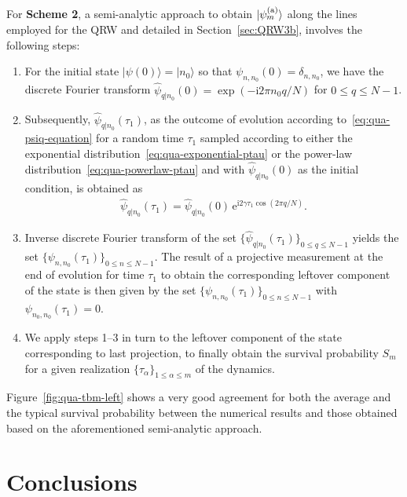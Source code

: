 \documentclass[12pt]{iopart}
\def\ra{\rangle}
\def\ket#1{\mathinner{|{#1}\rangle}}
\newcommand{\ee}{\mathrm{e}}
\newcommand{\ii}{\mathrm{i}}
\begin{document}
For \textbf{Scheme 2}, a semi-analytic approach to obtain
$\ket{\psi_m^{\rm (a)}}$ along the lines employed for the QRW and detailed in
Section~\ref{sec:QRW3b}, involves the following steps:
\begin{enumerate}
        \item For the initial state $|\psi(0)\ra=|n_0\ra$ so that
                $\psi_{n,n_0}(0)=\delta_{n,n_0}$, we have the discrete
                Fourier transform $\widehat{\psi}_{q|n_0}(0)=\exp(-\ii 2\pi
        n_0q/N)$ for $0 \le q \le N-1$.
\item Subsequently, $\widehat{\psi}_{q|n_0}(\tau_1)$, as the outcome of evolution according to~\eqref{eq:qua-psiq-equation} for a random time $\tau_1$ sampled according to either the exponential
distribution~\eqref{eq:qua-exponential-ptau} or the power-law
distribution~\eqref{eq:qua-powerlaw-ptau} and with
                $\widehat{\psi}_{q|n_0}(0)$ as the initial condition, is
                obtained as
                \begin{align}
                \widehat{\psi}_{q|n_0}(\tau_1) = \widehat{\psi}_{q|n_0}(0) \, \ee^{ \ii 2 \gamma \tau_1 \cos(2\pi q/N ) } .
                \end{align}
\item Inverse discrete Fourier transform of the set
$\{\widehat{\psi}_{q|n_0}(\tau_1)\}_{0 \le q \le N-1}$ yields the set
                $\{\psi_{n,n_0}(\tau_1)\}_{0 \le n \le N-1}$. The result
                of a projective measurement at the end of evolution for time
$\tau_1$ to obtain the corresponding leftover component of the
                state is then given by the set
                $\{\psi_{n,n_0}(\tau_1)\}_{0 \le n \le N-1}$ with
                $\psi_{n_0,n_0}(\tau_1)=0$. 
\item We apply steps 1--3 in turn to the leftover component of the 
state corresponding to last projection, to finally obtain the survival probability $S_m$ for a given realization
$\{\tau_\alpha\}_{1\le \alpha \le m}$ of the dynamics.
\end{enumerate}
Figure~\ref{fig:qua-tbm-left} shows a very good agreement for both the
average and the typical survival probability between the numerical
results and those obtained based on the aforementioned semi-analytic
approach.

\section{Conclusions}
\label{sec:conclusions}
\end{document}
